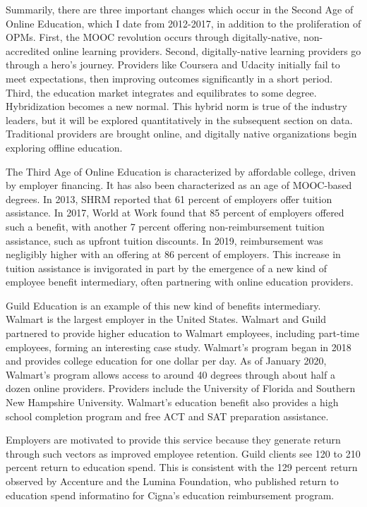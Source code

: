 \documentclass[review]{elsarticle}
\begin{document}
    Summarily, there are three important changes which occur in the Second Age of Online Education, which I date from 2012-2017, in addition to the proliferation of OPMs.
    First, the MOOC revolution occurs through digitally-native, non-accredited online learning providers.
    Second, digitally-native learning providers go through a hero's journey.
    Providers like Coursera and Udacity initially fail to meet expectations, then improving outcomes significantly in a short period.
    Third, the education market integrates and equilibrates to some degree.
    Hybridization becomes a new normal.
    This hybrid norm is true of the industry leaders, but it will be explored quantitatively in the subsequent section on data.
    Traditional providers are brought online, and digitally native organizations begin exploring offline education.

    The Third Age of Online Education is characterized by affordable college, driven by employer financing.
    It has also been characterized as an age of MOOC-based degrees.
    In 2013, SHRM reported that 61 percent of employers offer tuition assistance\cite{cherry2014rejuvenating}.
    In 2017, World at Work found that 85 percent of employers offered such a benefit,
    with another 7 percent offering non-reimbursement tuition assistance, such as upfront tuition discounts\cite{talentculture_2018}.
    In 2019, reimbursement was negligibly higher with an offering at 86 percent of employers\cite{worldatwork_2019}.
    This increase in tuition assistance is invigorated in part by the emergence of a new kind of employee benefit intermediary,
    often partnering with online education providers.

    Guild Education is an example of this new kind of benefits intermediary. Walmart is the largest employer in the United States.
    Walmart and Guild partnered to provide higher education to Walmart employees, including part-time employees, forming an interesting case study.
    Walmart's program began in 2018 and provides college education for one dollar per day\cite{walmart_2018}.
    As of January 2020, Walmart's program allows access to around 40 degrees through about half a dozen online providers\cite{guild_walmart_2020}.
    Providers include the University of Florida and Southern New Hampshire University.
    Walmart's education benefit also provides a high school completion program and free ACT and SAT preparation assistance.

    Employers are motivated to provide this service because they generate return through such vectors as improved employee retention.
    Guild clients see 120 to 210 percent return to education spend\cite{hunter_2019}.
    This is consistent with the 129 percent return observed by Accenture and the Lumina Foundation,
    who published return to education spend informatino for Cigna's education reimbursement program\cite{mccann_2016}.
\end{document}
